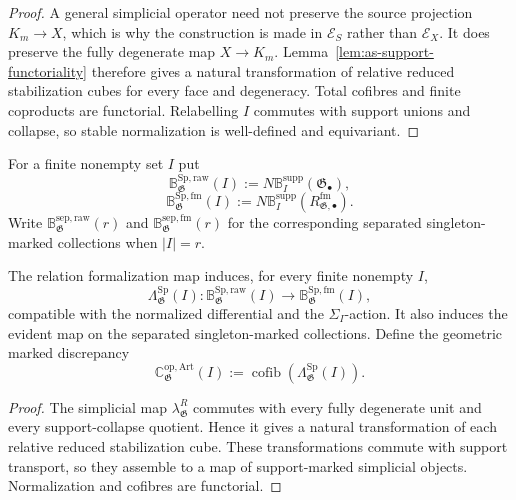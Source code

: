 \begin{proof}
A general simplicial operator need not preserve the source projection
$K_m\to X$, which is why the construction is made in $\mathcal E_S$ rather
than $\mathcal E_X$.  It does preserve the fully degenerate map $X\to K_m$.
Lemma~\ref{lem:as-support-functoriality} therefore gives a natural
transformation of relative reduced stabilization cubes for every face and
degeneracy.  Total cofibres and finite coproducts are functorial.  Relabelling
$I$ commutes with support unions and collapse, so stable normalization is
well-defined and equivariant.
\end{proof}

\begin{definition}
\label{def:as-raw-formalized-operation-systems}
For a finite nonempty set $I$ put
\[
    \mathbb B_{\mathfrak G}^{\mathrm{Sp,raw}}(I)
    :=
    N\mathbb B_I^{\mathrm{supp}}(\mathfrak G_\bullet),
\]
\[
    \mathbb B_{\mathfrak G}^{\mathrm{Sp,fm}}(I)
    :=
    N\mathbb B_I^{\mathrm{supp}}
    (R_{\mathfrak G,\bullet}^{\mathrm{fm}}).
\]
Write $\mathbb B_{\mathfrak G}^{\mathrm{sep,raw}}(r)$ and
$\mathbb B_{\mathfrak G}^{\mathrm{sep,fm}}(r)$ for the corresponding separated
singleton-marked collections when $|I|=r$.
\end{definition}

\begin{theorem}
\label{thm:as-raw-formalized-operation-comparison}
The relation formalization map induces, for every finite nonempty $I$,
\[
\boxed{
    \Lambda_{\mathfrak G}^{\mathrm{Sp}}(I):
    \mathbb B_{\mathfrak G}^{\mathrm{Sp,raw}}(I)
    \longrightarrow
    \mathbb B_{\mathfrak G}^{\mathrm{Sp,fm}}(I),}
\]
compatible with the normalized differential and the $\Sigma_I$-action.  It
also induces the evident map on the separated singleton-marked collections.
Define the geometric marked discrepancy
\[
\boxed{
    \mathbb C_{\mathfrak G}^{\mathrm{op,Art}}(I)
    :=
    \operatorname{cofib}
    \left(\Lambda_{\mathfrak G}^{\mathrm{Sp}}(I)\right).}
\]
\end{theorem}

\begin{proof}
The simplicial map $\lambda^R_{\mathfrak G}$ commutes with every fully
degenerate unit and every support-collapse quotient.  Hence it gives a natural
transformation of each relative reduced stabilization cube.  These
transformations commute with support transport, so they assemble to a map of
support-marked simplicial objects.  Normalization and cofibres are functorial.
\end{proof}

